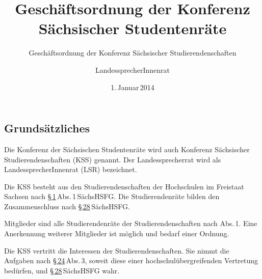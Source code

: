 \documentclass[
	pdftex,
]{scrartcl}
\title{Geschäftsordnung der Konferenz Sächsischer Studentenräte}
\subtitle{Geschäftsordnung der Konferenz Sächsischer Studierendenschaften}
\author{LandessprecherInnenrat}
\date{1.\,Januar\,2014}
\newcounter{PraeSentenceCounter}
\newcommand{\PraeSentence}{\addtocounter{PraeSentenceCounter}{1}\textsuperscript{\arabic{PraeSentenceCounter}}}
\begin{document}
\tableofcontents

\maketitle

\begin{contract}


\parnumberfalse\part{Grundsätzliches}\parnumbertrue


\Sentence Die Konferenz der Sächsischen Studentenräte wird auch Konferenz Sächsischer Studierendenschaften (KSS) genannt.
\Sentence Der Landessprecherrat wird als LandessprecherInnenrat (LSR) bezeichnet.

\label{Rechtsstellung Aufgaben und Mitwirkung}

\Sentence Die KSS besteht aus den Studierendenschaften der Hochschulen im Freistaat Sachsen nach \href{http://www.revosax.sachsen.de/Details.do?sid=4771115631165&jlink=p1}{§\,1}\,Abs.\,1\,SächsHSFG.
\Sentence Die Studierendenräte bilden den Zusammenschluss nach \href{http://www.revosax.sachsen.de/Details.do?sid=4771115631165&jlink=p28}{§\,28}\,SächsHSFG.

\Sentence Mitglieder sind alle Studierendenräte der Studierendenschaften nach Abs.\,1.
\Sentence Eine Anerkennung weiterer Mitglieder ist möglich und bedarf einer Ordnung.

\Sentence Die KSS vertritt die Interessen der Studierendenschaften.
\Sentence Sie nimmt die Aufgaben nach \href{http://www.revosax.sachsen.de/Details.do?sid=4771115631165&jlink=p24}{§\,24}\,Abs.\,3, soweit diese einer hochschulübergreifenden Vertretung bedürfen, und \href{http://www.revosax.sachsen.de/Details.do?sid=4771115631165&jlink=p28}{§\,28}\,SächsHSFG wahr.


\end{contract}
\end{document}
